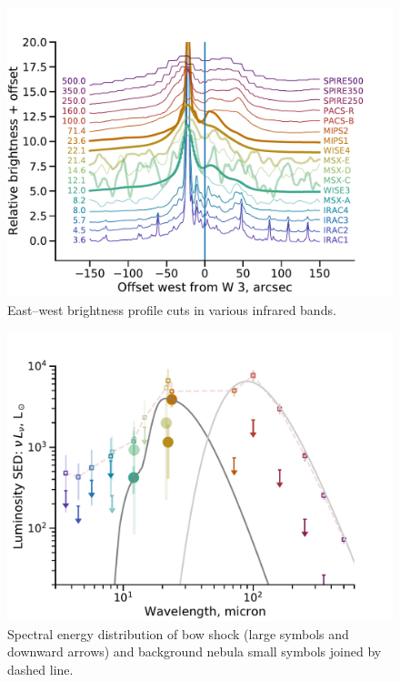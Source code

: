 \documentclass[twocolumn, times]{aastex631}
\begin{document}
\begin{figure}
  \centering
  \includegraphics[width=\linewidth]{figs/ngc346-infrared-profiles}
  \caption{
    East--west brightness profile cuts in various infrared bands. 
    }
  \label{fig:infrared-profiles}
\end{figure}

\begin{figure}
  \centering
  \includegraphics[width=\linewidth]{figs/ngc346-infrared-sed}
  \caption{
    Spectral energy distribution of bow shock (large symbols and downward arrows)
    and background nebula small symbols joined by dashed line.
    }
  \label{fig:infrared-sed}
\end{figure}
\end{document}
